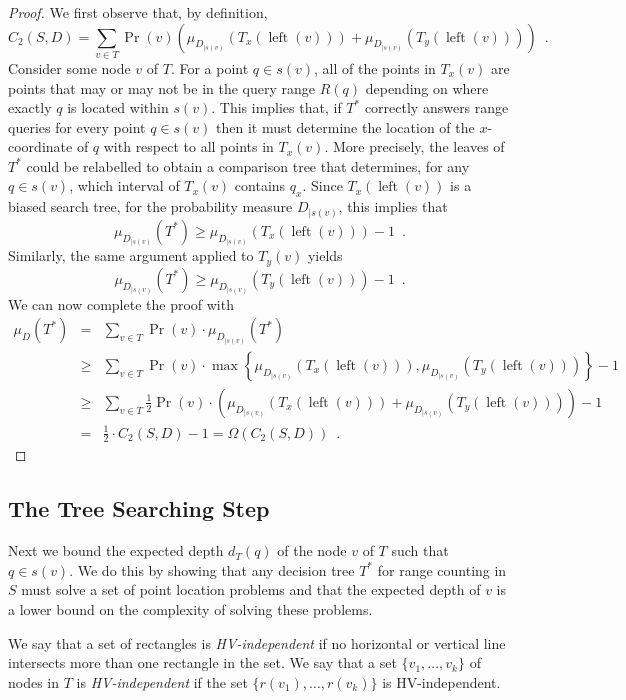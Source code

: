 \documentclass[lotsofwhite,charterfonts]{patmorin}
\DeclareMathOperator{\lft}{left}
\begin{document}
\begin{proof}
We first observe that, by definition,
\[
  C_2(S,D) =  \sum_{v\in T} 
              \Pr(v)\left( \mu_{D_{\mid s(v)}}(T_x(\lft(v)))
                               +  \mu_{D_{\mid s(v)}}(T_y(\lft(v))) \right)
           \enspace .
\]
Consider some node $v$ of $T$.  For a point $q\in s(v)$, all of the
points in $T_x(v)$ are points that may or may not be in the query
range $R(q)$ depending on where exactly $q$ is located within $s(v)$.
This implies that, if $T^*$ correctly answers range queries for every
point $q\in s(v)$ then it must determine the location of the
$x$-coordinate of $q$ with respect to all points in $T_x(v)$.  More
precisely, the leaves of $T^*$ could be relabelled to obtain a
comparison tree that determines, for any $q\in s(v)$, which interval
of $T_x(v)$ contains $q_x$.  Since $T_x(\lft(v))$ is a biased search tree,
for the probability measure $D_{\mid s(v)}$, this implies that
\[
  \mu_{D_{\mid s(v)}}(T^*) \ge \mu_{D_{\mid s(v)}}(T_x(\lft(v))) - 1\enspace .
\]
Similarly, the same argument applied to $T_y(v)$ yields 
\[
  \mu_{D_{\mid s(v)}}(T^*) \ge \mu_{D_{\mid s(v)}}(T_y(\lft(v))) - 1\enspace .
\]
We can now complete the proof with
\begin{eqnarray*}
\mu_D(T^*) 
 & = & \sum_{v\in T} \Pr(v)\cdot\mu_{D_{\mid s(v)}}(T^*) \\
 & \ge & \sum_{v\in T}
	\Pr(v) \cdot\max\left\{\mu_{D_{\mid s(v)}}(T_x(\lft(v))), 
		       \mu_{D_{\mid s(v)}}(T_y(\lft(v)))\right\} - 1 \\
 & \ge & \sum_{v\in T}
	\frac{1}{2}\Pr(v)\cdot\left( \mu_{D_{\mid s(v)}}(T_x(\lft(v)))
                             +  \mu_{D_{\mid s(v)}}(T_y(\lft(v))) \right) - 1 \\
 & = & \frac{1}{2}\cdot C_2(S,D) - 1 = \Omega(C_2(S,D)) \enspace .
\end{eqnarray*}
\end{proof}

\subsection{The Tree Searching Step}

Next we bound the expected depth $d_T(q)$ of the node $v$ of $T$ such
that $q\in s(v)$.  We do this by showing that any decision tree $T^*$
for range counting in $S$ must solve a set of point location problems
and that the expected depth of $v$ is a lower bound on the complexity
of solving these problems.

We say that a set of rectangles is \emph{HV-independent} if no
horizontal or vertical line intersects more than one rectangle in the
set.  We say that a set $\{v_1,\ldots,v_k\}$ of nodes in $T$ is
\emph{HV-independent} if the set $\{r(v_1),\ldots,r(v_k)\}$ is
HV-independent.
\end{document}
